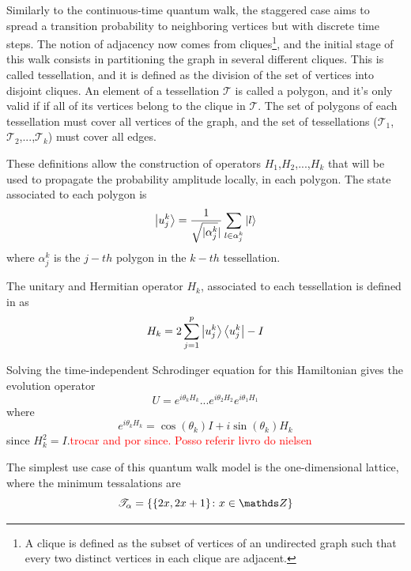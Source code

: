 \documentclass[../../dissertation.tex]{subfiles}
\begin{document}
Similarly to the continuous-time quantum walk, the staggered case aims to spread a transition probability to neighboring vertices but with discrete time steps. The notion of adjacency now comes from cliques\footnote{A clique is defined as the subset of vertices of an undirected graph such that every two distinct vertices in each clique are adjacent.}, and the initial stage of this walk consists in partitioning the graph in several different cliques. This is called tessellation, and it is defined as the division of the set of vertices into disjoint cliques. An element of a tessellation $\mathscr{T}$ is called a polygon, and it's only valid if if all of its vertices belong to the clique in $\mathscr{T}$. The set of polygons of each tessellation must cover all vertices of the graph, and the set of tessellations ($\mathscr{T}_{1}$,$\mathscr{T}_{2}$,...,$\mathscr{T}_{k}$) must cover all edges.\par
These definitions allow the construction of operators $H_1$,$H_2$,...,$H_k$ that will be used to propagate the probability amplitude locally, in each polygon. The state associated to each polygon is
\begin{equation}
	\ket{u_{j}^{k}} = \frac{1}{\sqrt{\mathopen|\alpha_{j}^{k}}\mathclose|}\sum_{l\in\alpha_{j}^{k}}\ket{l}
\end{equation}
where $\alpha_{j}^{k}$ is the $j-th$ polygon in the $k-th$ tessellation.\par
The unitary and Hermitian operator $H_k$, associated to each tessellation is defined in \cite{portugal2017b} as
\begin{equation}
	H_k = 2\sum_{j=1}^{p}\ket{u_{j}^{k}}\bra{u_{j}^{k}} - I
	\label{eq:StagHamil}
\end{equation}\par
Solving the time-independent Schrodinger equation for this Hamiltonian gives the evolution operator
\begin{equation}
	U = e^{i\theta_{k}H_{k}}...e^{i\theta_{2}H_{2}}e^{i\theta_{1}H_{1}}
	\label{eq:stagWalkUnmodOp}
\end{equation}
where
\begin{equation}
	e^{i\theta_{k}H_{k}} = \cos{(\theta_k)}I + i\sin{(\theta_k)}H_k
\end{equation}
since $H_k^2 = I$.\textcolor{red}{trocar and por since. Posso referir livro do nielsen}\par
The simplest use case of this quantum walk model is the one-dimensional lattice, where the minimum tessalations are
\begin{equation}
	\mathscr{T}_{\alpha}= \{\{2x,2x+1\}\colon x \in \Z\}
\end{equation}
\end{document}
